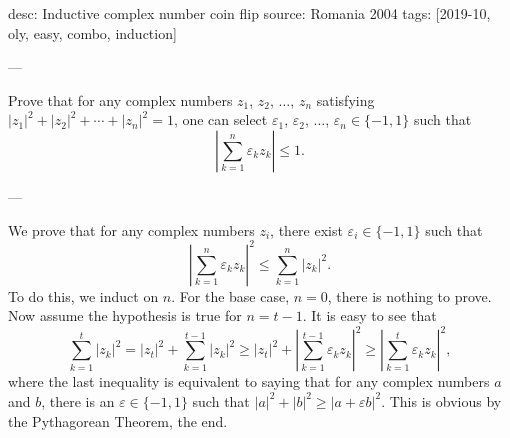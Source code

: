 desc: Inductive complex number coin flip
source: Romania 2004
tags: [2019-10, oly, easy, combo, induction]

---

Prove that for any complex numbers $z_1$, $z_2$, $\ldots$, $z_n$ satisfying $|z_1|^2+|z_2|^2+\cdots+|z_n|^2=1$, one can select $\varepsilon_1$, $\varepsilon_2$, $\ldots$, $\varepsilon_n\in\{-1,1\}$ such that \[\left\lvert\sum_{k=1}^n\varepsilon_kz_k\right\rvert\le1.\]

---

We prove that for any complex numbers $z_i$, there exist $\varepsilon_i\in\{-1,1\}$ such that \[\left\lvert\sum_{k=1}^n\varepsilon_kz_k\right\rvert^2\le\sum_{k=1}^n\left\lvert z_k\right\rvert^2.\]
To do this, we induct on $n$. For the base case, $n=0$, there is nothing to prove. Now assume the hypothesis is true for $n=t-1$. It is easy to see that \[\sum_{k=1}^t\left\lvert z_k\right\rvert^2=\left\lvert z_t\right\rvert^2+\sum_{k=1}^{t-1}\left\lvert z_k\right\rvert^2\ge\left\lvert z_t\right\rvert^2+\left\lvert\sum_{k=1}^{t-1}\varepsilon_kz_k\right\rvert^2\ge\left\lvert\sum_{k=1}^t\varepsilon_kz_k\right\rvert^2,\]
where the last inequality is equivalent to saying that for any complex numbers $a$ and $b$, there is an $\varepsilon\in\{-1,1\}$ such that $\left\lvert a\right\rvert^2+\left\lvert b\right\rvert^2\ge\left\lvert a+\varepsilon b\right\rvert^2$. This is obvious by the Pythagorean Theorem, the end.
